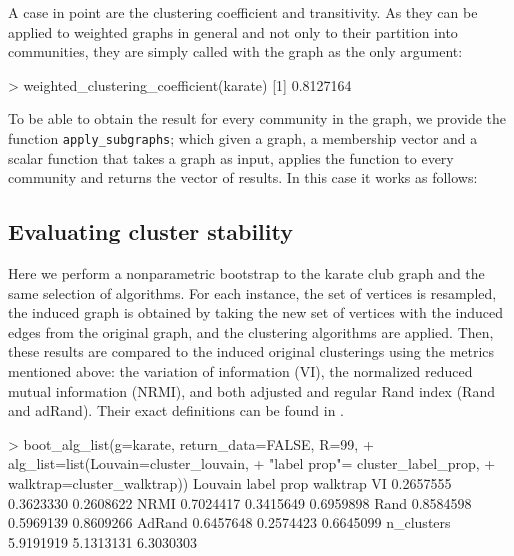  
A case in point are the clustering coefficient and transitivity.
As they can be applied to weighted graphs in general and not only to their partition into communities, they are simply called with the graph as the only argument:
\begin{example}
> weighted_clustering_coefficient(karate)
[1] 0.8127164
\end{example}

To be able to obtain the result for every community in the graph, we provide the function \texttt{apply\_subgraphs}; which given a graph, a membership vector and a scalar function that takes a graph as input, applies the function to every community and returns the vector of results. In this case it works as follows:







\subsection{Evaluating cluster stability}
Here we perform a nonparametric bootstrap to the karate club graph and the same selection of algorithms. For each instance, the set of vertices is resampled, the induced graph is obtained by taking the new set of vertices with the induced edges from the original graph, and the clustering algorithms are applied. Then, these results are compared to the induced original clusterings using the metrics mentioned above: the variation of information (VI), the normalized reduced mutual information (NRMI), and both adjusted and regular Rand index (Rand and adRand). Their exact definitions can be found in \citep{arratia2021clustering}.
\begin{example}
> boot_alg_list(g=karate, return_data=FALSE, R=99,
+               alg_list=list(Louvain=cluster_louvain, 
+                             "label prop"= cluster_label_prop, 
+                             walktrap=cluster_walktrap)) 
             Louvain label prop  walktrap
VI         0.2657555  0.3623330 0.2608622
NRMI       0.7024417  0.3415649 0.6959898
Rand       0.8584598  0.5969139 0.8609266
AdRand     0.6457648  0.2574423 0.6645099
n_clusters 5.9191919  5.1313131 6.3030303
\end{example}

